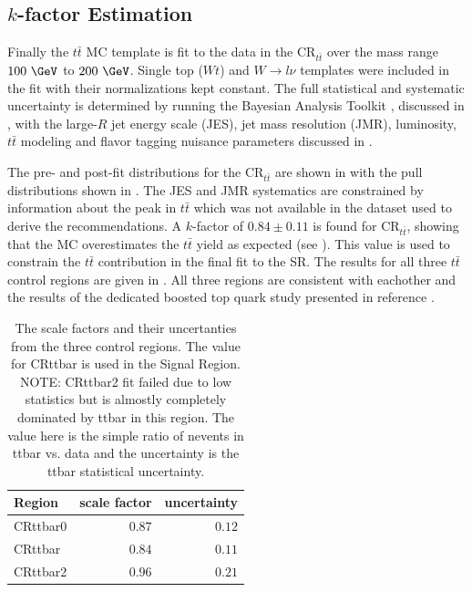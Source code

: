 \subsection{$k$-factor Estimation}

Finally the $t\bar{t}$ MC template is fit to the data in the
$\text{CR}_{t\bar{t}}$ over the mass range $100~\GeV$ to $200~\GeV$.  Single
top ($Wt$) and $W \rightarrow l\nu$ templates were included in the fit with
their normalizations kept constant. The full statistical and systematic
uncertainty is determined by running the Bayesian Analysis Toolkit
\cite{Beaujean:2011zz}, discussed in , with the large-$R$ jet
energy scale (JES), jet mass resolution (JMR), luminosity, $t\bar{t}$
modeling and flavor tagging nuisance parameters discussed in
.

The pre- and post-fit distributions for the $\text{CR}_{t\bar{t}}$ are shown in
 with the pull distributions shown in
.  The JES and JMR systematics are constrained
by information about the peak in $t\bar{t}$ which was not available in the
dataset used to derive the recommendations. A $k$-factor of $0.84 \pm 0.11$ is
found for $\text{CR}_{t\bar{t}}$, showing that the MC overestimates the
$t\bar{t}$ yield as expected (see ). This
value is used to constrain the $t\bar{t}$ contribution in the final fit to the
SR. The results for all three $t\bar{t}$ control regions are given in
.  All three regions are consistent with eachother
and the results of the dedicated boosted top quark study presented in reference
\cite{ATLAS:2016jct}.

\begin{table}
  \centering
  \caption{The \ttbar scale factors and their uncertanties from the three \ttbar
control regions. The value for CRttbar is used in the Signal Region. NOTE:
CRttbar2 fit failed due to low statistics but is almostly completely dominated
by ttbar in this region.  The value here is the simple ratio of nevents in ttbar
vs. data and the uncertainty is the ttbar statistical uncertainty.}
  \begin{tabular}{@{}lrr@{}}
    \toprule
    Region & scale factor & uncertainty \\
    \midrule
    CRttbar0 & $0.87$ & $0.12$ \\
    CRttbar  & $0.84$ & $0.11$ \\
    CRttbar2 & $0.96$ & $0.21$ \\
    \bottomrule
  \end{tabular}
  \label{table:ttbar_kfactors}
\end{table}


